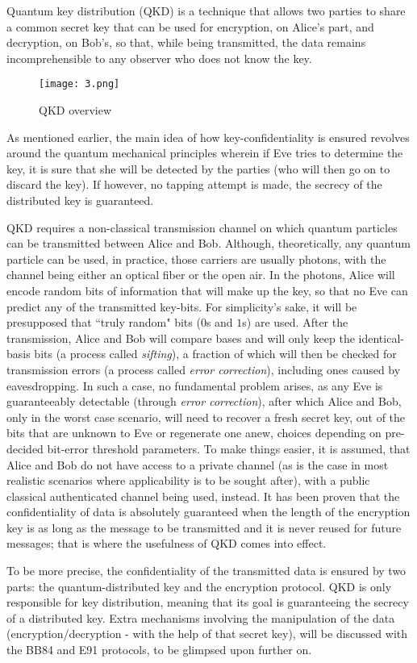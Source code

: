 Quantum key distribution (QKD) is a technique that allows two parties to share a
common secret key that can be used for encryption, on Alice’s part, and decryption,
on Bob's, so that, while being transmitted, the data remains incomprehensible to any observer 
who does not know the key.
\begin{figure}[!h]
\centering
\texttt{[image: 3.png]}
\caption{QKD overview}
\label{fig3}
\end{figure}
As mentioned earlier, the main idea of how key-confidentiality is ensured revolves around the quantum mechanical principles
wherein if Eve tries to determine the key, it is sure that she will be detected by the parties 
(who will then go on to discard the key). If however, no tapping attempt is made, the secrecy of the distributed key 
is guaranteed.

QKD requires a non-classical transmission channel on which quantum particles can be transmitted between Alice and Bob. 
Although, theoretically, any quantum particle can be used, in practice, those carriers are usually photons, with the
channel being either an optical fiber or the open air.
In the photons, Alice will encode random bits of information that will make up the key, so that no Eve can 
predict any of the transmitted key-bits.
For simplicity's sake, it will be presupposed that ``truly random" bits ($0$s and $1$s) are used.
After the transmission, Alice and Bob will compare bases and will only keep the identical-basis bits (a process called {\it sifting}), 
a fraction of which will then be checked for transmission errors (a process called {\it error correction}),
including ones caused by eavesdropping.
In such a case, no fundamental problem arises, as any Eve is guaranteeably detectable 
(through {\it error correction}), after which Alice and Bob, only in the worst case scenario, will need to recover a fresh secret key, 
out of the bits that are unknown to Eve or regenerate one anew, choices depending on pre-decided bit-error threshold parameters.
To make things easier, it is assumed, that Alice and Bob do not have access to a
private channel (as is the case in most realistic scenarios where applicability is to be
sought after), with a public classical authenticated channel being used, instead.
It has been proven that the confidentiality of data is absolutely guaranteed when
the length of the encryption key is as long as the message to be transmitted and it is never
reused for future messages; that is where the usefulness of QKD comes into effect.

To be more precise, the confidentiality of the transmitted data is ensured by two parts: the
quantum-distributed key and the encryption protocol. QKD is only
responsible for key distribution, meaning that its goal is guaranteeing the secrecy of a
distributed key. Extra mechanisms involving the manipulation of the data
(encryption/decryption - with the help of that secret key), will be discussed with the BB84
and E91 protocols, to be glimpsed upon further on.
